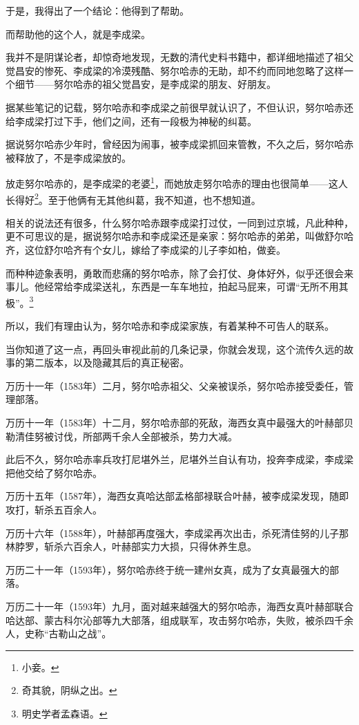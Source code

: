 \begin{multicols}{\theparacolNo}
		于是，我得出了一个结论：他得到了帮助。

		而帮助他的这个人，就是李成梁。

		我并不是阴谋论者，却惊奇地发现，无数的清代史料书籍中，都详细地描述了祖父觉昌安的惨死、李成梁的冷漠残酷、努尔哈赤的无助，却不约而同地忽略了这样一个细节——努尔哈赤的祖父觉昌安，是李成梁的朋友、好朋友。

		据某些笔记的记载，努尔哈赤和李成梁之前很早就认识了，不但认识，努尔哈赤还给李成梁打过下手，他们之间，还有一段极为神秘的纠葛。

		据说努尔哈赤少年时，曾经因为闹事，被李成梁抓回来管教，不久之后，努尔哈赤被释放了，不是李成梁放的。

		放走努尔哈赤的，是李成梁的老婆\footnote{小妾。}，而她放走努尔哈赤的理由也很简单——这人长得好\footnote{奇其貌，阴纵之出。}。至于他俩有无其他纠葛，我不知道，也不想知道。

		相关的说法还有很多，什么努尔哈赤跟李成梁打过仗，一同到过京城，凡此种种，更不可思议的是，据说努尔哈赤和李成梁还是亲家：努尔哈赤的弟弟，叫做舒尔哈齐，这位舒尔哈齐有个女儿，嫁给了李成梁的儿子李如柏，做妾。

		而种种迹象表明，勇敢而悲痛的努尔哈赤，除了会打仗、身体好外，似乎还很会来事儿。他经常给李成梁送礼，东西是一车车地拉，拍起马屁来，可谓“无所不用其极”。\footnote{明史学者孟森语。}

		所以，我们有理由认为，努尔哈赤和李成梁家族，有着某种不可告人的联系。

		当你知道了这一点，再回头审视此前的几条记录，你就会发现，这个流传久远的故事的第二版本，以及隐藏其后的真正秘密。

		万历十一年（1583年）二月，努尔哈赤祖父、父亲被误杀，努尔哈赤接受委任，管理部落。

		万历十一年（1583年）十二月，努尔哈赤部的死敌，海西女真中最强大的叶赫部贝勒清佳努被讨伐，所部两千余人全部被杀，势力大减。

		此后不久，努尔哈赤率兵攻打尼堪外兰，尼堪外兰自认有功，投奔李成梁，李成梁把他交给了努尔哈赤。

		万历十五年（1587年），海西女真哈达部孟格部禄联合叶赫，被李成梁发现，随即攻打，斩杀五百余人。

		万历十六年（1588年），叶赫部再度强大，李成梁再次出击，杀死清佳努的儿子那林脖罗，斩杀六百余人，叶赫部实力大损，只得休养生息。

		万历二十一年（1593年），努尔哈赤终于统一建州女真，成为了女真最强大的部落。

		万历二十一年（1593年）九月，面对越来越强大的努尔哈赤，海西女真叶赫部联合哈达部、蒙古科尔沁部等九大部落，组成联军，攻击努尔哈赤，失败，被杀四千余人，史称“古勒山之战”。


\end{multicols}
